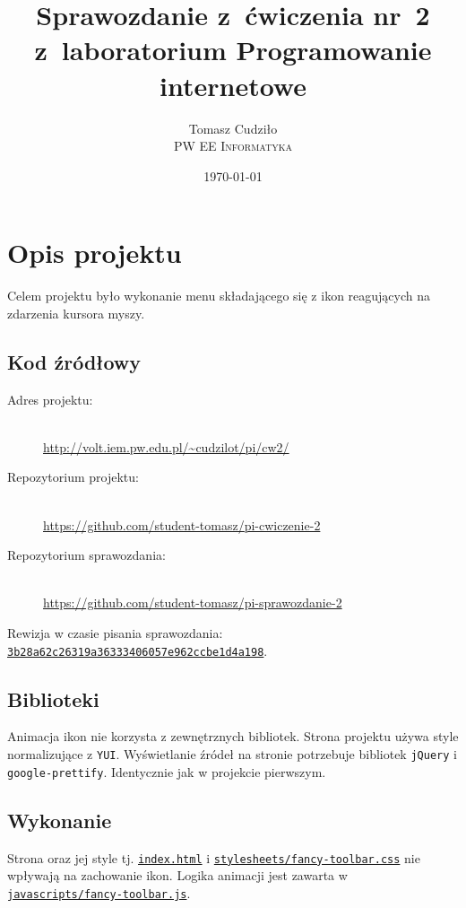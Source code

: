 \documentclass[10pt,a4paper]{article}
\newcommand{\f}[1]{\texttt{#1}}
\newcommand{\rev}{3b28a62c26319a36333406057e962ccbe1d4a198}
\newcommand{\revhref}[1] {\href{https://github.com/student-tomasz/pi-cwiczenie-2/blob/\rev/#1}{\f{#1}}}
\begin{document}
\title{
  Sprawozdanie z~ćwiczenia nr~2\\z~laboratorium Programowanie internetowe
}
\author{
  Tomasz Cudziło\\
  \textsc{PW EE Informatyka}\\[10pt]
}
\date{\today}
\maketitle



\section{Opis projektu}

Celem projektu było wykonanie menu składającego się z ikon reagujących na
zdarzenia kursora myszy.

\subsection{Kod źródłowy}
\begin{description}
  \item[Adres projektu:] \hfill \\
  \url{http://volt.iem.pw.edu.pl/~cudzilot/pi/cw2/}
  \item[Repozytorium projektu:] \hfill \\
  \url{https://github.com/student-tomasz/pi-cwiczenie-2}
  \item[Repozytorium sprawozdania:] \hfill \\
  \url{https://github.com/student-tomasz/pi-sprawozdanie-2}
\end{description}
Rewizja w czasie pisania sprawozdania:
\href{https://github.com/student-tomasz/pi-cwiczenie-2/tree/\rev}{\f{\rev}}.

\subsection{Biblioteki}

Animacja ikon nie korzysta z zewnętrznych bibliotek. Strona projektu używa style
normalizujące z \f{YUI}. Wyświetlanie źródeł na stronie potrzebuje bibliotek
\f{jQuery} i \f{google-prettify}. Identycznie jak w projekcie pierwszym.

\subsection{Wykonanie}
Strona oraz jej style tj. \revhref{index.html} i
\revhref{stylesheets/fancy-toolbar.css} nie wpływają na zachowanie ikon. Logika
animacji jest zawarta w \revhref{javascripts/fancy-toolbar.js}.
\end{document}

